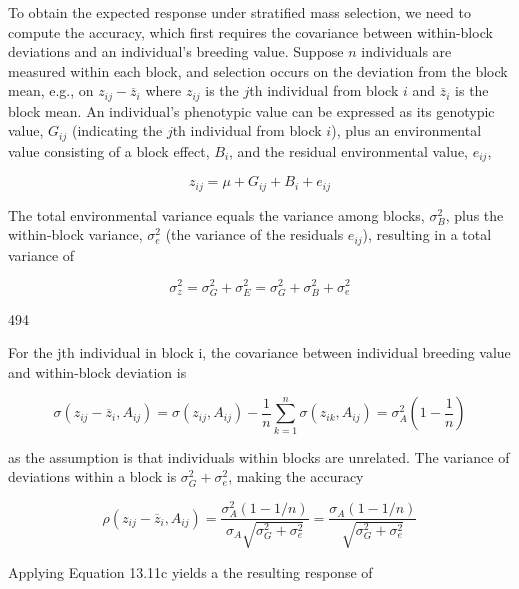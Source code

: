 \documentclass{article}
\begin{document}
To obtain the expected response under stratified mass selection, we need to compute the accuracy, which first requires the covariance between within-block deviations and an individual's breeding value. Suppose $n$ individuals are measured within each block, and selection occurs on the deviation from the block mean, e.g., on $z_{ij} - \overline{z}_i$ where $z_{ij}$ is the $j$th individual from block $i$ and $\overline{z}_i$ is the block mean. An individual's phenotypic value can be expressed as its genotypic value, $G_{ij}$ (indicating the $j$th individual from block $i$), plus an environmental value consisting of a block effect, $B_i$, and the residual environmental value, $e_{ij}$,

\begin{equation}
z_{ij}=\mu+G_{ij}+B_{i}+e_{ij}
\tag{13.12a}
\label{eq:13_12a}
\end{equation}

The total environmental variance equals the variance among blocks,  $ \sigma_{B}^{2} $, plus the within-block variance,  $ \sigma_{e}^{2} $ (the variance of the residuals  $ e_{ij} $), resulting in a total variance of

\begin{equation}
\sigma_{z}^{2}=\sigma_{G}^{2}+\sigma_{E}^{2}=\sigma_{G}^{2}+\sigma_{B}^{2}+\sigma_{e}^{2}
\tag{13.12b}
\label{eq:13_12b}
\end{equation}

494

For the jth individual in block i, the covariance between individual breeding value and within-block deviation is

\begin{equation}
\sigma(z_{ij}-\overline{z}_{i},A_{ij})=\sigma(z_{ij},A_{ij})-\frac{1}{n}\sum_{k=1}^{n}\sigma(z_{ik},A_{ij})=\sigma_{A}^{2}\left(1-\frac{1}{n}\right)
\tag{13.13}
\label{eq:13_13}
\end{equation}

as the assumption is that individuals within blocks are unrelated. The variance of deviations within a block is  $ \sigma_G^2 + \sigma_e^2 $, making the accuracy

\begin{equation}
\rho(z_{ij}-\overline{z}_{i},A_{ij})=\frac{\sigma_{A}^{2}(1-1/n)}{\sigma_{A}\sqrt{\sigma_{G}^{2}+\sigma_{e}^{2}}}=\frac{\sigma_{A}(1-1/n)}{\sqrt{\sigma_{G}^{2}+\sigma_{e}^{2}}}
\tag{13.14a}
\label{eq:13_14a}
\end{equation}

Applying Equation 13.11c yields a the resulting response of
\end{document}
